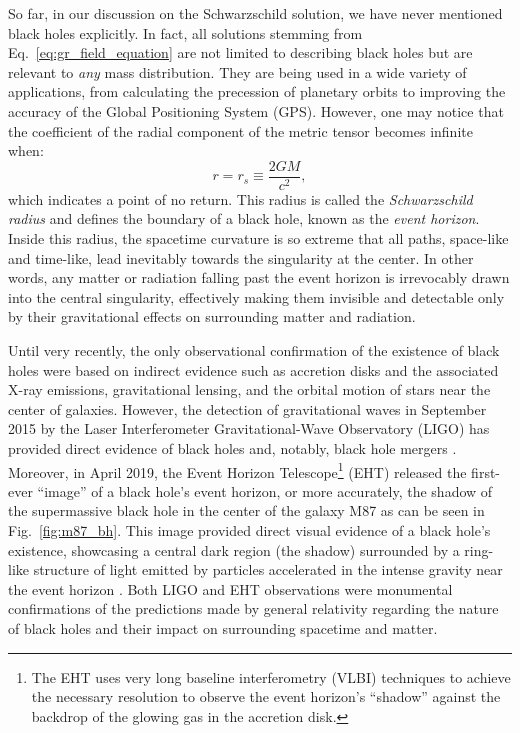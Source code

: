 \documentclass[main.tex]{subfiles}
\begin{document}
    So far, in our discussion on the Schwarzschild solution, we have never mentioned black holes explicitly. In fact, all solutions stemming from Eq.~\eqref{eq:gr_field_equation} are not limited to describing black holes but are relevant to \textit{any} mass distribution. They are being used in a wide variety of applications, from calculating the precession of planetary orbits to improving the accuracy of the Global Positioning System (GPS). However, one may notice that the coefficient of the radial component of the metric tensor becomes infinite when:
    \begin{equation}\label{eq:schwarzschild_radius}
        r = r_s \equiv \frac{2GM}{c^2},
    \end{equation}
    which indicates a point of no return. This radius is called the \textit{Schwarzschild radius} and defines the boundary of a black hole, known as the \textit{event horizon}. Inside this radius, the spacetime curvature is so extreme that all paths, space-like and time-like, lead inevitably towards the singularity at the center. In other words, any matter or radiation falling past the event horizon is irrevocably drawn into the central singularity, effectively making them invisible and detectable only by their gravitational effects on surrounding matter and radiation.

    Until very recently, the only observational confirmation of the existence of black holes were based on indirect evidence such as accretion disks and the associated X-ray emissions, gravitational lensing, and the orbital motion of stars near the center of galaxies. However, the detection of gravitational waves in September 2015 by the Laser Interferometer Gravitational-Wave Observatory (LIGO) has provided direct evidence of black holes and, notably, black hole mergers \citep{LIGO:BHmerger}. Moreover, in April 2019, the Event Horizon Telescope\footnote{The EHT uses very long baseline interferometry (VLBI) techniques to achieve the necessary resolution to observe the event horizon's ``shadow'' against the backdrop of the glowing gas in the accretion disk.} (EHT) released the first-ever ``image'' of a black hole's event horizon, or more accurately, the shadow of the supermassive black hole in the center of the galaxy M87 as can be seen in Fig.~\ref{fig:m87_bh}. This image provided direct visual evidence of a black hole's existence, showcasing a central dark region (the shadow) surrounded by a ring-like structure of light emitted by particles accelerated in the intense gravity near the event horizon \citep{EHT:M87}. Both LIGO and EHT observations were monumental confirmations of the predictions made by general relativity regarding the nature of black holes and their impact on surrounding spacetime and matter.
\end{document}
